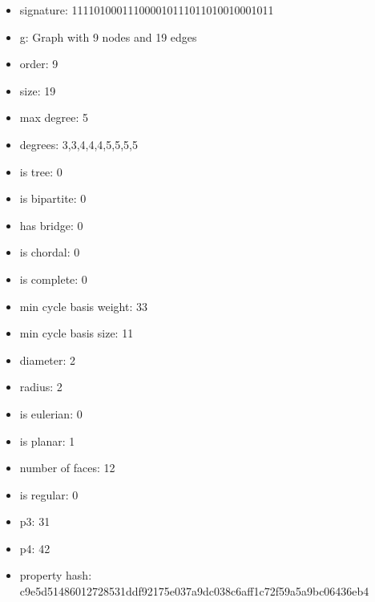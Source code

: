 \newpage
\begin{figure}
\end{figure}
\begin{itemize}
\item signature: 111101000111000010111011010010001011
\item g: Graph with 9 nodes and 19 edges
\item order: 9
\item size: 19
\item max degree: 5
\item degrees: 3,3,4,4,4,5,5,5,5
\item is tree: 0
\item is bipartite: 0
\item has bridge: 0
\item is chordal: 0
\item is complete: 0
\item min cycle basis weight: 33
\item min cycle basis size: 11
\item diameter: 2
\item radius: 2
\item is eulerian: 0
\item is planar: 1
\item number of faces: 12
\item is regular: 0
\item p3: 31
\item p4: 42
\item property hash: c9e5d51486012728531ddf92175e037a9dc038c6aff1c72f59a5a9bc06436eb4
\end{itemize}
